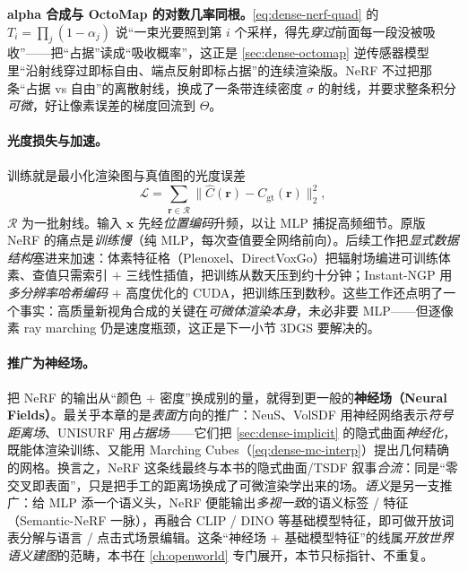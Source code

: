 \begin{insight}
\textbf{alpha 合成与 OctoMap 的对数几率同根。}\cref{eq:dense-nerf-quad} 的 $T_i=\prod_j(1-\alpha_j)$ 说“一束光要照到第 $i$ 个采样，得先\emph{穿过}前面每一段没被吸收”——把“占据”读成“吸收概率”，这正是 \cref{sec:dense-octomap} 逆传感器模型里“沿射线穿过即标自由、端点反射即标占据”的连续渲染版。NeRF 不过把那条“占据 vs 自由”的离散射线，换成了一条带连续密度 $\sigma$ 的射线，并要求整条积分\emph{可微}，好让像素误差的梯度回流到 $\Theta$。
\end{insight}

\paragraph{光度损失与加速。}
训练就是最小化渲染图与真值图的光度误差
\begin{equation}
  \mathcal{L}=\sum_{\mathbf{r}\in\mathcal{R}}\bigl\|\hat{C}(\mathbf{r})-C_{\mathrm{gt}}(\mathbf{r})\bigr\|_2^2,
  \label{eq:dense-nerf-loss}
\end{equation}
$\mathcal{R}$ 为一批射线。输入 $\mathbf{x}$ 先经\emph{位置编码}升频，以让 MLP 捕捉高频细节。原版 NeRF 的痛点是\emph{训练慢}（纯 MLP，每次查值要全网络前向）。后续工作把\emph{显式数据结构}塞进来加速：体素特征格（Plenoxel、DirectVoxGo）把辐射场编进可训练体素、查值只需索引 $+$ 三线性插值，把训练从数天压到约十分钟；Instant-NGP\cite{mueller2022instantngp} 用\emph{多分辨率哈希编码} $+$ 高度优化的 CUDA，把训练压到数秒。这些工作还点明了一个事实：高质量新视角合成的关键在\emph{可微体渲染本身}，未必非要 MLP——但逐像素 ray marching 仍是速度瓶颈，这正是下一小节 3DGS 要解决的。

\paragraph{推广为神经场。}
把 NeRF 的输出从“颜色 $+$ 密度”换成别的量，就得到更一般的\textbf{神经场（Neural Fields）}。最关乎本章的是\emph{表面}方向的推广：NeuS\cite{wang2021neus}、VolSDF 用神经网络表示\emph{符号距离场}、UNISURF 用\emph{占据场}——它们把 \cref{sec:dense-implicit} 的隐式曲面\emph{神经化}，既能体渲染训练、又能用 Marching Cubes（\cref{eq:dense-mc-interp}）提出几何精确的网格。换言之，NeRF 这条线最终与本书的隐式曲面/TSDF 叙事\emph{合流}：同是“零交叉即表面”，只是把手工的距离场换成了可微渲染学出来的场。\emph{语义}是另一支推广：给 MLP 添一个语义头，NeRF 便能输出\emph{多视一致}的语义标签 / 特征（Semantic-NeRF 一脉），再融合 CLIP / DINO 等基础模型特征，即可做开放词表分解与语言 / 点击式场景编辑。这条“神经场 $+$ 基础模型特征”的线属\emph{开放世界语义建图}的范畴，本书在 \cref{ch:openworld} 专门展开，本节只标指针、不重复。

